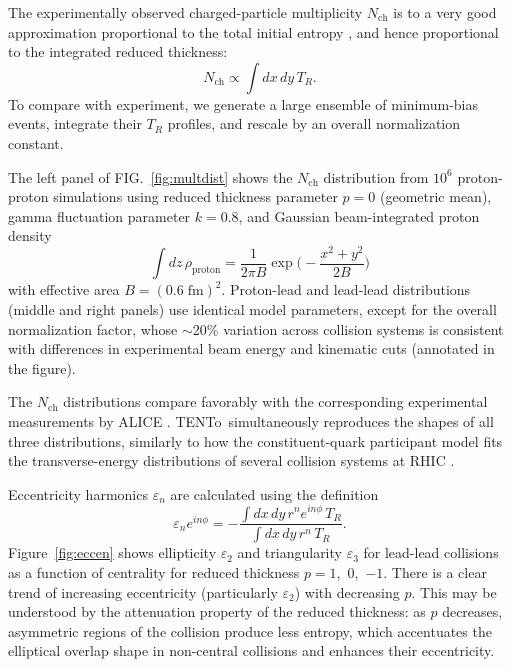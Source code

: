 \documentclass[aps,prc,reprint,amsmath,nofootinbib]{revtex4-1}
\newcommand{\trento}{T\raisebox{-.5ex}{R}ENTo}
\newcommand{\nch}{N_\text{ch}}
\begin{document}

The experimentally observed charged-particle multiplicity $\nch$ is to a very good approximation proportional to the total initial entropy \cite{}, and hence proportional to the integrated reduced thickness:
\begin{equation}
  \nch \propto \int dx \, dy \, T_R.
\end{equation}
To compare with experiment, we generate a large ensemble of minimum-bias events, integrate their $T_R$ profiles, and rescale by an overall normalization constant.

The left panel of FIG.~\ref{fig:multdist} shows the $\nch$ distribution from $10^6$ proton-proton simulations
using reduced thickness parameter $p = 0$ (geometric mean), gamma fluctuation parameter $k = 0.8$, and
Gaussian beam-integrated proton density
\begin{equation}
  \int dz \, \rho_\text{proton} = \frac{1}{2\pi B} \exp\biggr( -\frac{x^2 + y^2}{2B} \biggr)
\end{equation}
with effective area $B = (0.6\;\text{fm})^2$.
Proton-lead and lead-lead distributions (middle and right panels) use identical model parameters, except for the overall normalization factor, whose $\sim$20\% variation across collision systems is consistent with differences in experimental beam energy and kinematic cuts (annotated in the figure).

The $\nch$ distributions compare favorably with the corresponding experimental measurements by ALICE \cite{}.
\trento\ simultaneously reproduces the shapes of all three distributions, similarly to how the constituent-quark participant model fits the transverse-energy distributions of several collision systems at RHIC \cite{Adler:2013aqf}.


Eccentricity harmonics $\varepsilon_n$ are calculated using the definition
\begin{equation}
  \varepsilon_n e^{i n\phi} = -\frac{\int dx \, dy\, r^n e^{i n \phi} \, T_R}{\int dx \, dy \, r^n \, T_R}.
\end{equation}
Figure~\ref{fig:eccen} shows ellipticity $\varepsilon_2$ and triangularity $\varepsilon_3$ for lead-lead collisions as a function of centrality for reduced thickness $p = 1$,~0,~$-1$.  There is a clear trend of increasing eccentricity
(particularly $\varepsilon_2$) with decreasing $p$.  This may be understood by the attenuation property of the
reduced thickness:  as $p$ decreases, asymmetric regions of the collision produce less entropy, which
accentuates the elliptical overlap shape in non-central collisions and enhances their eccentricity.
\end{document}
